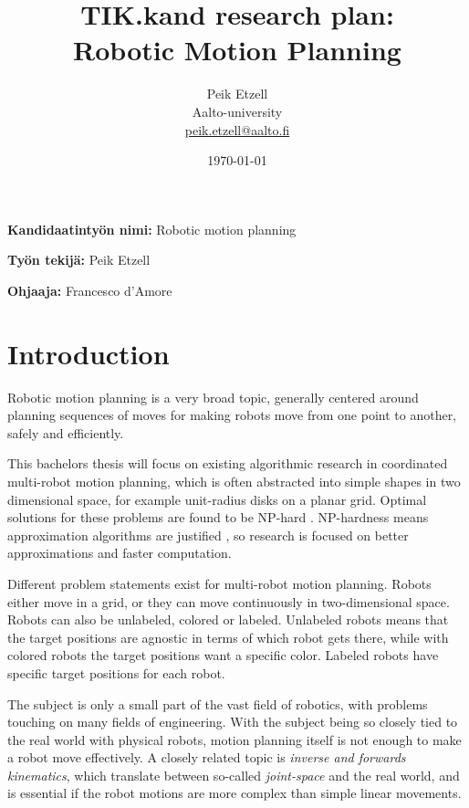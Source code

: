 \documentclass[12pt,a4paper,english,oneside]{article}
\begin{document}

\title{TIK.kand research plan:\\[5mm]
Robotic Motion Planning}

\author{Peik Etzell\\
Aalto-university\\
\url{peik.etzell@aalto.fi}}

\date{\today}

\maketitle


\vspace{10mm}

\textbf{Kandidaatintyön nimi:} Robotic motion planning %

\textbf{Työn tekijä:} Peik Etzell

\textbf{Ohjaaja:} Francesco d'Amore


\section{Introduction}

Robotic motion planning is a very broad topic, generally centered around planning sequences of moves for making robots move from one point to another, safely and efficiently. 

This bachelors thesis will focus on existing algorithmic research in coordinated multi-robot motion planning, which is often abstracted into simple shapes in two dimensional space, for example unit-radius disks on a planar grid. 
Optimal solutions for these problems are found to be NP-hard \cite{demaine_coordinated_2019}. NP-hardness means approximation algorithms are justified \cite{demaine_coordinated_2019}, so research is focused on better approximations and faster computation. 

Different problem statements exist for multi-robot motion planning. Robots either move in a grid, or they can move continuously in two-dimensional space. Robots can also be unlabeled, colored or labeled. Unlabeled robots means that the target positions are agnostic in terms of which robot gets there, while with colored robots the target positions want a specific color. Labeled robots have specific target positions for each robot. 

The subject is only a small part of the vast field of robotics, with problems touching on many fields of engineering. With the subject being so closely tied to the real world with physical robots, motion planning itself is not enough to make a robot move effectively. A closely related topic is \emph{inverse and forwards kinematics}, which translate between so-called \emph{joint-space} and the real world, and is essential if the robot motions are more complex than simple linear movements. 
\end{document}
